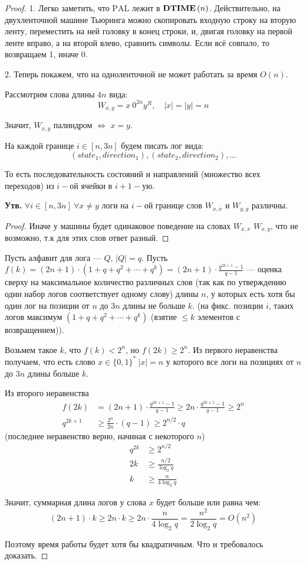 \begin{proof} \par
1. Легко заметить, что $\mathrm{PAL}$ лежит в $\textbf{DTIME}\left({n}\right)$. Действительно, на двухленточной машине Тьюринга можно скопировать входную строку на вторую ленту, переместить на ней головку в конец строки, и, двигая головку на первой ленте вправо, а на второй влево, сравнить символы. Если всё совпало, то возвращаем 1, иначе 0.

2. Теперь покажем, что на одноленточной не может работать за время $O(n)$.

Рассмотрим слова длины $4n$ вида:
\[W_{x,y}=x\ 0^{2n}y^R, \quad |x|=|y|=n\]

Значит, $W_{x,y}$ палиндром $\iff$ $x=y$.

На каждой границе $i\in[n,3n]$ будем писать лог вида:
\[(state_1, direction_1), (state_2, direction_2), \ldots\]

То есть последовательность состояний и направлений (множество всех переходов) из $i-\text{ой}$ ячейки в $i+1-\text{ую}$.

\textbf{Утв.}
$\forall i\in[n,3n]\ \forall x\neq y$ логи на $i-\text{ой}$ границе слов $W_{x,x}$ и $W_{y,y}$ различны.

\begin{proof}
Иначе у машины будет одинаковое поведение на словах $W_{x,x}$ $W_{x,y}$, что не возможно, т.к для этих слов ответ разный. 
\end{proof}

Пусть алфавит для лога --- $Q$, $|Q| = q$.
Пусть $f(k) = (2n+1)\cdot(1+q+q^2+\cdots+q^k) = (2n+1)\cdot\frac{q^{2k+1}-1}{q-1}$ --- оценка сверху на максимальное количество различных слов (так как по утверждению один набор логов соответствует одному слову) длины $n$, у которых есть хотя бы один лог на позиции от $n$ до $3n$ длины не больше $k$. (на фикс. позиции $i$, таких логов максимум $(1+q+q^2+\cdots+q^k)$ (взятие $\le k$ элементов с возвращением)).

Возьмем такое $k$, что $f(k) < 2^n$, но $f(2k) \ge 2^n$.
Из первого неравенства получаем, что есть слово $x\in\{0,1\}^*\ |x|=n$ у которого все логи на позициях от $n$ до $3n$ длины больше $k$.

Из второго неравенства
\begin{align*}
f(2k)&=(2n+1)\cdot\frac{q^{2k+1}-1}{q-1}\ge 2n\cdot\frac{q^{2k+1}-1}{q-1}\ge 2^n\\
q^{2k+1} &\ge \frac{2^n}{2n}\cdot (q-1) \ge 2 ^{n/2}\cdot q 
\end{align*} (последнее неравенство верно, начиная с некоторого $n$)
\begin{align*}
	q^{2k}&\ge 2^{n/2}\\
	2k &\ge \frac{n/2}{\log_2 q}\\
	k &\ge \frac{n}{4\log_2 q}
\end{align*}

Значит, суммарная длина логов у слова $x$ будет больше или равна чем:
\[(2n + 1) \cdot k \ge 2n \cdot k \ge 2n \cdot \frac{n}{4\log_2 q} = \frac{n^2}{2\log_2 q} = O(n^2)\]

Поэтому время работы будет хотя бы квадратичным.
Что и требовалось доказать. 
\end{proof}

